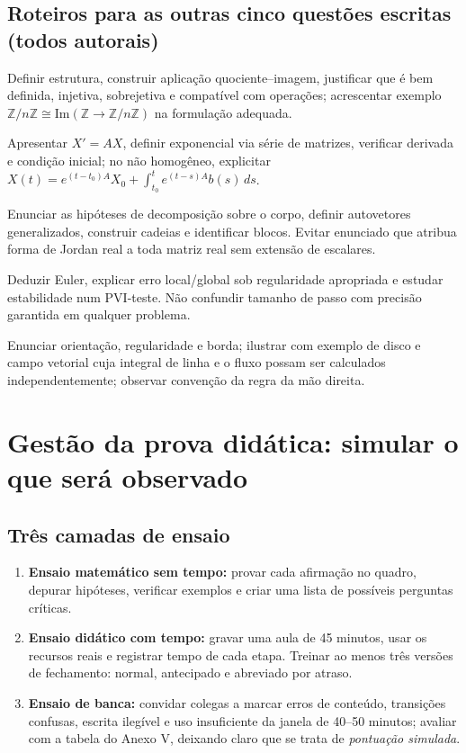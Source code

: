 \documentclass[11pt,a4paper]{article}
\begin{document}
\subsection{Roteiros para as outras cinco questões escritas (todos autorais)}
\begin{description}[style=nextline,leftmargin=0pt]
\item[Teorema do Isomorfismo] Definir estrutura, construir aplicação quociente--imagem, justificar que é bem definida, injetiva, sobrejetiva e compatível com operações; acrescentar exemplo $\mathbb Z/n\mathbb Z\cong\mathrm{Im}(\mathbb Z\to\mathbb Z/n\mathbb Z)$ na formulação adequada.
\item[Sistemas lineares de EDOs] Apresentar $X'=AX$, definir exponencial via série de matrizes, verificar derivada e condição inicial; no não homogêneo, explicitar $X(t)=e^{(t-t_0)A}X_0+\int_{t_0}^t e^{(t-s)A}b(s)\,ds$.
\item[Jordan] Enunciar as hipóteses de decomposição sobre o corpo, definir autovetores generalizados, construir cadeias e identificar blocos. Evitar enunciado que atribua forma de Jordan real a toda matriz real sem extensão de escalares.
\item[EDOs numéricas] Deduzir Euler, explicar erro local/global sob regularidade apropriada e estudar estabilidade num PVI-teste. Não confundir tamanho de passo com precisão garantida em qualquer problema.
\item[Stokes] Enunciar orientação, regularidade e borda; ilustrar com exemplo de disco e campo vetorial cuja integral de linha e o fluxo possam ser calculados independentemente; observar convenção da regra da mão direita.
\end{description}

\section{Gestão da prova didática: simular o que será observado}
\subsection{Três camadas de ensaio}
\begin{enumerate}
\item \textbf{Ensaio matemático sem tempo:} provar cada afirmação no quadro, depurar hipóteses, verificar exemplos e criar uma lista de possíveis perguntas críticas.
\item \textbf{Ensaio didático com tempo:} gravar uma aula de 45 minutos, usar os recursos reais e registrar tempo de cada etapa. Treinar ao menos três versões de fechamento: normal, antecipado e abreviado por atraso.
\item \textbf{Ensaio de banca:} convidar colegas a marcar erros de conteúdo, transições confusas, escrita ilegível e uso insuficiente da janela de 40--50 minutos; avaliar com a tabela do Anexo V, deixando claro que se trata de \emph{pontuação simulada}.
\end{enumerate}
\end{document}

